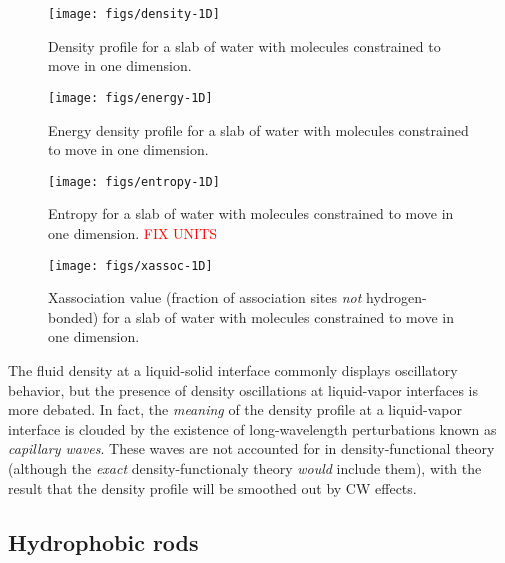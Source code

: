 \documentclass[letterpaper,twocolumn,amsmath,amssymb,prb]{revtex4-1}
\begin{document}
\begin{figure}
\begin{center}
\texttt{[image: figs/density-1D]}
\end{center}
\caption{ Density profile for a slab of water with molecules constrained to move in one dimension. }
\label{fig:density-1D}
\end{figure}

\begin{figure}
\begin{center}
\texttt{[image: figs/energy-1D]}
\end{center}
\caption{ Energy density profile for a slab of water with molecules constrained to move in one dimension. }
\label{fig:energy-1D}
\end{figure}

\begin{figure}
\begin{center}
\texttt{[image: figs/entropy-1D]}
\end{center}
\caption{ Entropy for a slab of water with molecules constrained to move in one 
dimension. \textcolor{red}{FIX UNITS}}
\label{fig:entropy-1D}
\end{figure}

\begin{figure}
\begin{center}
\texttt{[image: figs/xassoc-1D]}
\end{center}
\caption{ Xassociation value (fraction of association sites
\emph{not} hydrogen-bonded) for a slab of water with molecules constrained to move in one 
dimension. }
\label{fig:xassoc-1D}
\end{figure}

The fluid density at a liquid-solid interface commonly displays
oscillatory behavior, but the presence of density oscillations at
liquid-vapor interfaces is more debated\cite{penfold2001structure}.
In fact, the \emph{meaning} of the density profile at a liquid-vapor
interface is clouded by the existence of long-wavelength perturbations
known as \emph{capillary waves}.  These waves are not accounted for in
density-functional theory (although the \emph{exact}
density-functionaly theory \emph{would} include them), with the result
that the density profile will be smoothed out by CW effects.

\subsection{Hydrophobic rods}
\end{document}
